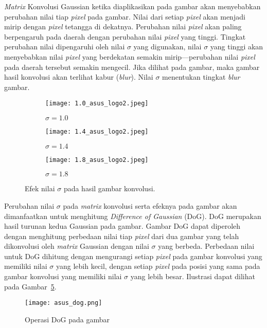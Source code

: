 \textit{Matrix} Konvolusi Gaussian ketika diaplikasikan pada gambar akan menyebabkan perubahan nilai tiap \textit{pixel} pada gambar. Nilai dari setiap \textit{pixel} akan menjadi mirip dengan \textit{pixel} tetangga di dekatnya. Perubahan nilai \textit{pixel} akan paling berpengaruh pada daerah dengan perubahan nilai \textit{pixel} yang tinggi. Tingkat perubahan nilai dipengaruhi oleh nilai $\sigma$ yang digunakan, nilai $\sigma$ yang tinggi akan menyebabkan nilai \textit{pixel} yang berdekatan semakin mirip---perubahan nilai \textit{pixel} pada daerah tersebut semakin mengecil. Jika dilihat pada gambar, maka gambar hasil konvolusi akan terlihat kabur (\textit{blur}). Nilai $\sigma$ menentukan tingkat \textit{blur} gambar.

\begin{figure}[H]
	\centering
	\begin{subfigure}[b]{.33\textwidth}
		\centering
		\texttt{[image: 1.0\_asus\_logo2.jpeg]}
		\caption{$\sigma=1.0$}
		\label{subfig:asus_sigma1.0}
	\end{subfigure}%
	\begin{subfigure}[b]{.33\textwidth}
		\centering
		\texttt{[image: 1.4\_asus\_logo2.jpeg]}
		\caption{$\sigma=1.4$}
		\label{subfig:asus_sigma1.4}
	\end{subfigure}
	\begin{subfigure}[b]{.33\textwidth}
		\centering
		\texttt{[image: 1.8\_asus\_logo2.jpeg]}
		\caption{$\sigma=1.8$}
		\label{subfig:asus_sigma1.8}
	\end{subfigure}
	\caption{Efek nilai $\sigma$ pada hasil gambar konvolusi.}
	\label{fig:asus_konv}
\end{figure}

Perubahan nilai $\sigma$ pada \textit{matrix} konvolusi serta efeknya pada gambar akan dimanfaatkan untuk menghitung \textit{Difference of Gaussian} (DoG). DoG merupakan hasil turunan kedua Gaussian pada gambar. Gambar DoG dapat diperoleh dengan menghitung perbedaan nilai tiap \textit{pixel} dari dua gambar yang telah dikonvolusi oleh \textit{matrix} Gaussian dengan nilai $\sigma$ yang berbeda. Perbedaan nilai untuk DoG dihitung dengan mengurangi setiap \textit{pixel} pada gambar konvolusi yang memiliki nilai $\sigma$ yang lebih kecil, dengan setiap \textit{pixel} pada posisi yang sama pada gambar konvolusi yang memiliki nilai $\sigma$ yang lebih besar. Ilustrasi dapat dilihat pada Gambar~\ref{fig:dog_asus}. 
\begin{figure}[t]
	\centering
	\texttt{[image: asus\_dog.png]}
	\caption{Operasi DoG pada gambar}
	\label{fig:dog_asus}
\end{figure} 

